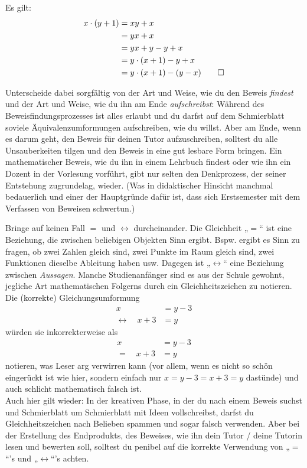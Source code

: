 \begin{bem}[„Gleichungs-U's“]
\begin{bew} Es gilt:
 \begin{align*}
  x\cdot (y+1) & = xy + x \\
  & = yx + x \\
  & = yx + y-y + x \\
  & = y\cdot (x+1) - y + x \\
  & = y\cdot (x+1)-(y-x) \qed
 \end{align*}
\end{bew}
Unterscheide dabei sorgfältig von der Art und Weise, wie du den Beweis \emph{findest} und der Art und Weise, wie du ihn am Ende \emph{aufschreibst}: Während des Beweisfindungsprozesses ist alles erlaubt und du darfst auf dem Schmierblatt soviele Äquivalenzumformungen aufschreiben, wie du willst. Aber am Ende, wenn es darum geht, den Beweis für deinen Tutor aufzuschreiben, solltest du alle Unsauberkeiten tilgen und den Beweis in eine gut lesbare Form bringen. Ein mathematischer Beweis, wie du ihn in einem Lehrbuch findest oder wie ihn ein Dozent in der Vorlesung vorführt, gibt nur selten den Denkprozess, der seiner Entstehung zugrundelag, wieder. (Was in didaktischer Hinsicht manchmal bedauerlich und einer der Hauptgründe dafür ist, dass sich Erstsemester mit dem Verfassen von Beweisen schwertun.)
\end{bem}




\begin{bem}[Unterschied zwischen $=$ und $\leftrightarrow$]
 Bringe auf keinen Fall $=$ und $\leftrightarrow$ durcheinander. Die Gleichheit „$=$“ ist eine Beziehung, die zwischen beliebigen Objekten Sinn ergibt. Bspw. ergibt es Sinn zu fragen, ob zwei Zahlen gleich sind, zwei Punkte im Raum gleich sind, zwei Funktionen dieselbe Ableitung haben usw. Dagegen ist „$\leftrightarrow$“ eine Beziehung zwischen \emph{Aussagen}. Manche Studienanfänger sind es aus der Schule gewohnt, jegliche Art mathematischen Folgerns durch ein Gleichheitszeichen zu notieren. Die (korrekte) Gleichungsumformung
 \begin{align*}
 x & = y-3 \\
   \leftrightarrow\quad  x+3 & = y
 \end{align*}
würden sie inkorrekterweise als
 \begin{align*}
  x & = y-3 \\
   = \quad x+3 & = y
 \end{align*}
 notieren, was Leser arg verwirren kann (vor allem, wenn es nicht so schön eingerückt ist wie hier, sondern einfach nur $x=y-3=x+3=y$ dastünde) und auch schlicht mathematisch falsch ist. \\
 Auch hier gilt wieder: In der kreativen Phase, in der du nach einem Beweis suchst und Schmierblatt um Schmierblatt mit Ideen vollschreibst, darfst du Gleichheitszeichen nach Belieben spammen und sogar falsch verwenden. Aber bei der Erstellung des Endprodukts, des Beweises, wie ihn dein Tutor / deine Tutorin lesen und bewerten soll, solltest du penibel auf die korrekte Verwendung von „$=$“'s und „$\leftrightarrow$“'s achten.
\end{bem}



